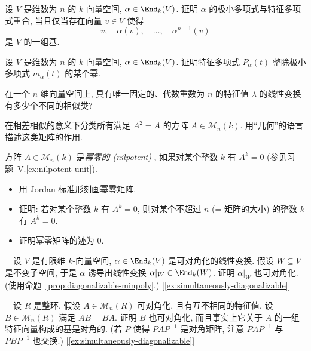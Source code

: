 \begin{prob}\label{ex:cyclic-vector-criterion}
设 $V$ 是维数为 $n$ 的 $k$-向量空间, $\alpha\in\End_k(V)$. 证明 $\alpha$ 的极小多项式与特征多项式重合, 当且仅当存在向量 $v\in V$ 使得
\[
v,\quad\alpha(v),\quad\ldots,\quad\alpha^{n-1}(v)
\]
是 $V$ 的一组基.
\end{prob}

\begin{prob}\label{ex:charpoly-divides-minpoly-power}
设 $V$ 是维数为 $n$ 的 $k$-向量空间, $\alpha\in\End_k(V)$. 证明特征多项式 $P_\alpha(t)$ 整除极小多项式 $m_\alpha(t)$ 的某个幂.
\end{prob}

\begin{prob}\label{ex:similarity-classes-single-eigenvalue}
在一个 $n$ 维向量空间上, 具有唯一固定的、代数重数为 $n$ 的特征值 $\lambda$ 的线性变换有多少个不同的相似类?
\end{prob}

\begin{prob}\label{ex:idempotent-matrices}
在相差相似的意义下分类所有满足 $A^2=A$ 的方阵 $A\in\mathcal{M}_n(k)$. 用``几何''的语言描述这类矩阵的作用.
\end{prob}

\begin{prob}\label{ex:nilpotent-matrices}
方阵 $A\in\mathcal{M}_n(k)$ 是\emph{幂零的 (nilpotent)}
, 如果对某个整数 $k$ 有 $A^k=0$ (参见习题~V.\ref{ex:nilpotent-unit}).
\begin{itemize}
	\item 用 Jordan 标准形刻画幂零矩阵.
	\item 证明: 若对某个整数 $k$ 有 $A^k=0$, 则对某个不超过 $n$ (= 矩阵的大小) 的整数 $k$ 有 $A^k=0$.
	\item 证明幂零矩阵的迹为 $0$.
\end{itemize}
\end{prob}

\begin{prob}\label{ex:invariant-subspace-restriction-diagonalizable}
$\neg$ 设 $V$ 是有限维 $k$-向量空间, $\alpha\in\End_k(V)$ 是可对角化的线性变换. 假设 $W\subseteq V$ 是不变子空间, 于是 $\alpha$ 诱导出线性变换 $\alpha|_W\in\End_k(W)$. 证明 $\alpha|_W$ 也可对角化. (使用命题~\ref{prop:diagonalizable-minpoly}.) [\ref{ex:simultaneously-diagonalizable}]
\end{prob}

\begin{prob}\label{ex:commuting-with-diagonalizable}
$\neg$ 设 $R$ 是整环. 假设 $A\in\mathcal{M}_n(R)$ 可对角化, 且有互不相同的特征值. 设 $B\in\mathcal{M}_n(R)$ 满足 $AB=BA$. 证明 $B$ 也可对角化, 而且事实上它关于 $A$ 的一组特征向量构成的基是对角的. (若 $P$ 使得 $PAP^{-1}$ 是对角矩阵, 注意 $PAP^{-1}$ 与 $PBP^{-1}$ 也交换.) [\ref{ex:simultaneously-diagonalizable}]
\end{prob}

